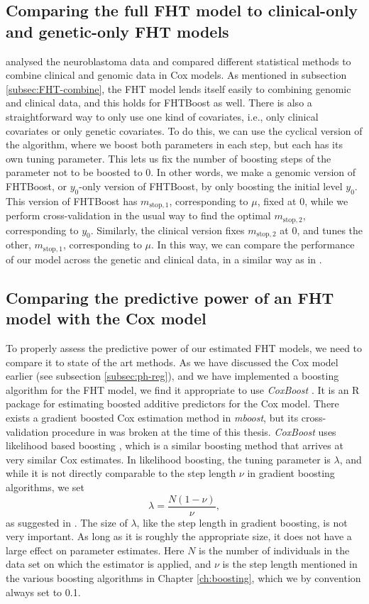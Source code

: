 \subsection{Comparing the full FHT model to clinical-only and genetic-only FHT models}
\citet{bovelstad2009} analysed the neuroblastoma data and compared different statistical methods to combine clinical and genomic data in Cox models.
As mentioned in subsection \ref{subsec:FHT-combine}, the FHT model lends itself easily to combining genomic and clinical data, and this holds for FHTBoost as well.
There is also a straightforward way to only use one kind of covariates, i.e., only clinical covariates or only genetic covariates.
To do this, we can use the cyclical version of the algorithm, where we boost both parameters in each step, but each has its own tuning parameter.
This lets us fix the number of boosting steps of the parameter not to be boosted to 0.
In other words, we make a genomic version of FHTBoost, or $y_0$-only version of FHTBoost, by only boosting the initial level $y_0$.
This version of FHTBoost has $m_{\text{stop},1}$, corresponding to $\mu$, fixed at 0, while we perform cross-validation in the usual way to find the optimal $m_{\text{stop},2}$, corresponding to $y_0$.
Similarly, the clinical version fixes $m_{\text{stop},2}$ at 0, and tunes the other, $m_{\text{stop},1}$, corresponding to $\mu$.
In this way, we can compare the performance of our model across the genetic and clinical data, in a similar way as in \citet{bovelstad2009}.

\subsection{Comparing the predictive power of an FHT model with the Cox model}
To properly assess the predictive power of our estimated FHT models, we need to compare it to state of the art methods.
As we have discussed the Cox model earlier (see subsection \ref{subsec:ph-reg}), and we have implemented a boosting algorithm for the FHT model, we find it appropriate to use \textit{CoxBoost} \citep{coxboost}.
It is an R package for estimating boosted additive predictors for the Cox model.
There exists a gradient boosted Cox estimation method in \textit{mboost}, but its cross-validation procedure in was broken at the time of this thesis. 
\textit{CoxBoost} uses likelihood based boosting \citep{gamboost}, which is a similar boosting method that arrives at very similar Cox estimates.
In likelihood boosting, the tuning parameter is $\lambda$, and while it is not directly comparable to the step length $\nu$ in gradient boosting algorithms, we set
\begin{equation}\label{eq:lambda-nu}
    \lambda=\frac{N(1-\nu)}{\nu},
\end{equation}
as suggested in \citet{DeBin2016}.
The size of $\lambda$, like the step length in gradient boosting, is not very important.
As long as it is roughly the appropriate size, it does not have a large effect on parameter estimates.
Here $N$ is the number of individuals in the data set on which the estimator is applied, and $\nu$ is the step length mentioned in the various boosting algorithms in Chapter \ref{ch:boosting}, which we by convention always set to 0.1.

